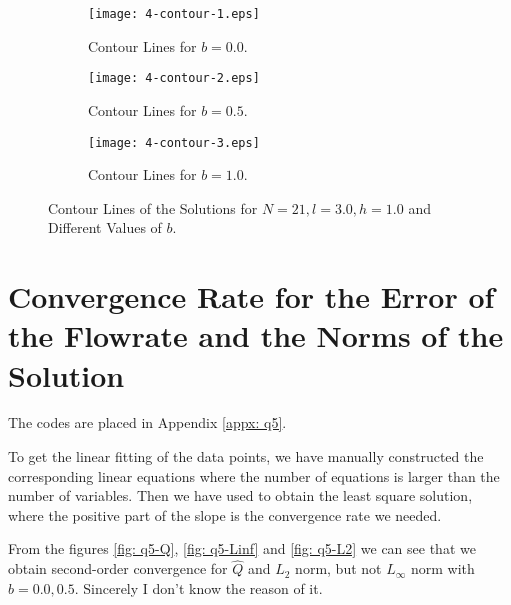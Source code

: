 \documentclass{assignment}[2019/10/15]
\begin{document}
    \begin{figure}[htb]
        \begin{subfigure}[b]{0.32\textwidth}
            \centering
            \texttt{[image: 4-contour-1.eps]}
            \caption{Contour Lines for $b = 0.0$.}
        \end{subfigure}
        \hfill
        \begin{subfigure}[b]{0.32\textwidth}
            \centering
            \texttt{[image: 4-contour-2.eps]}
            \caption{Contour Lines for $b = 0.5$.}
        \end{subfigure}
        \hfill
        \begin{subfigure}[b]{0.32\textwidth}
            \centering
            \texttt{[image: 4-contour-3.eps]}
            \caption{Contour Lines for $b = 1.0$.}
        \end{subfigure}
        \caption{Contour Lines of the Solutions for $N = 21, l = 3.0, h = 1.0$ and Different Values of $b$.}
        \label{fig: q4}
    \end{figure}

    \section{Convergence Rate for the Error of the Flowrate and the Norms of the Solution}

    The codes are placed in Appendix \ref{appx: q5}.

    To get the linear fitting of the data points, we have manually constructed the corresponding linear equations where the number of equations is larger than the number of variables. Then we have used \matlabinline{\\} to obtain the least square solution, where the positive part of the slope is the convergence rate we needed.

    From the figures \ref{fig: q5-Q}, \ref{fig: q5-Linf} and \ref{fig: q5-L2} we can see that we obtain second-order convergence for $\hat Q$ and $L_2$ norm, but not $L_\infty$ norm with $b = 0.0, 0.5$. Sincerely I don't know the reason of it.
\end{document}

